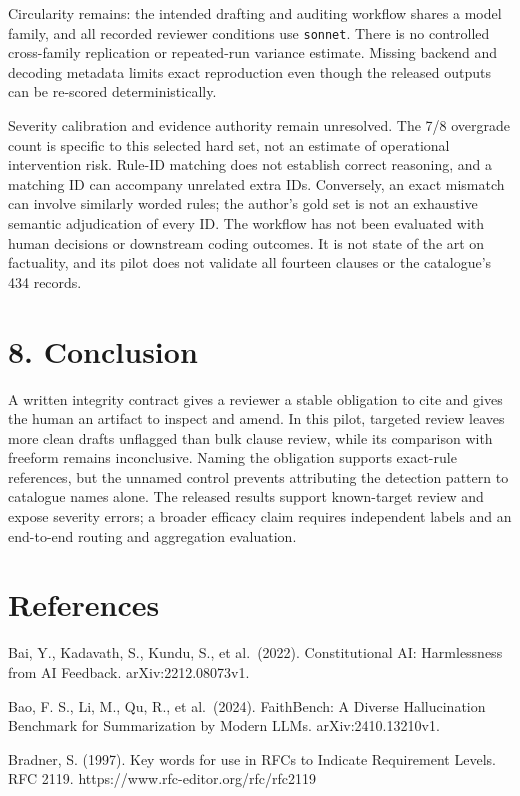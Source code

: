 \documentclass[
  10pt,
  a4paper,
]{article}
\begin{document}
Circularity remains: the intended drafting and auditing workflow shares
a model family, and all recorded reviewer conditions use
\texttt{sonnet}. There is no controlled cross-family replication or
repeated-run variance estimate. Missing backend and decoding metadata
limits exact reproduction even though the released outputs can be
re-scored deterministically.

Severity calibration and evidence authority remain unresolved. The 7/8
overgrade count is specific to this selected hard set, not an estimate
of operational intervention risk. Rule-ID matching does not establish
correct reasoning, and a matching ID can accompany unrelated extra IDs.
Conversely, an exact mismatch can involve similarly worded rules; the
author's gold set is not an exhaustive semantic adjudication of every
ID. The workflow has not been evaluated with human decisions or
downstream coding outcomes. It is not state of the art on factuality,
and its pilot does not validate all fourteen clauses or the catalogue's
434 records.

\section{8. Conclusion}\label{conclusion}

A written integrity contract gives a reviewer a stable obligation to
cite and gives the human an artifact to inspect and amend. In this
pilot, targeted review leaves more clean drafts unflagged than bulk
clause review, while its comparison with freeform remains inconclusive.
Naming the obligation supports exact-rule references, but the unnamed
control prevents attributing the detection pattern to catalogue names
alone. The released results support known-target review and expose
severity errors; a broader efficacy claim requires independent labels
and an end-to-end routing and aggregation evaluation.

\section{References}\label{references}

Bai, Y., Kadavath, S., Kundu, S., et al.~(2022). Constitutional AI:
Harmlessness from AI Feedback. arXiv:2212.08073v1.

Bao, F. S., Li, M., Qu, R., et al.~(2024). FaithBench: A Diverse
Hallucination Benchmark for Summarization by Modern LLMs.
arXiv:2410.13210v1.

Bradner, S. (1997). Key words for use in RFCs to Indicate Requirement
Levels. RFC 2119. https://www.rfc-editor.org/rfc/rfc2119
\end{document}
